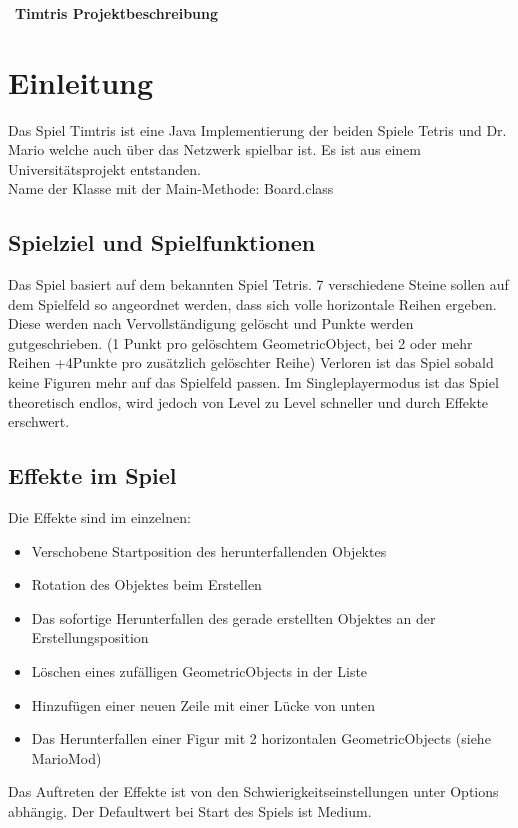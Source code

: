 \documentclass[10pt,a4paper,titlepage]{article}
\begin{document}
\tableofcontents
\ \\\\\\\
\textbf{\large Timtris Projektbeschreibung}\\
\section{Einleitung}
Das Spiel Timtris ist eine Java Implementierung der beiden Spiele Tetris und Dr. Mario welche auch über das Netzwerk spielbar ist. Es ist aus einem Universitätsprojekt entstanden.\\
Name der Klasse mit der Main-Methode: Board.class\\
\subsection{Spielziel und Spielfunktionen}
Das Spiel basiert auf dem bekannten Spiel Tetris.
7 verschiedene Steine sollen auf dem Spielfeld so angeordnet werden, dass sich volle
horizontale Reihen ergeben.
Diese werden nach Vervollständigung gelöscht und Punkte werden gutgeschrieben.
(1 Punkt pro gelöschtem GeometricObject, bei 2 oder mehr Reihen +4Punkte pro zusätzlich
gelöschter Reihe)
Verloren ist das Spiel sobald keine Figuren mehr auf das Spielfeld passen.
Im Singleplayermodus ist das Spiel theoretisch endlos, wird jedoch von Level zu Level
schneller und durch Effekte erschwert.
\subsection{Effekte im Spiel}
Die Effekte sind im einzelnen: 
\begin{itemize}
	\item Verschobene Startposition des herunterfallenden Objektes
	\item Rotation des Objektes beim Erstellen
	\item Das sofortige Herunterfallen des gerade erstellten
	Objektes an der Erstellungsposition
	\item Löschen eines zufälligen GeometricObjects in der
	Liste
	\item Hinzufügen einer neuen Zeile mit einer Lücke von unten
	\item Das Herunterfallen
	einer Figur mit 2 horizontalen GeometricObjects (siehe MarioMod)
\end{itemize}
Das Auftreten der Effekte ist von den Schwierigkeitseinstellungen unter Options abhängig.
Der Defaultwert bei Start des Spiels ist Medium.
\end{document}
